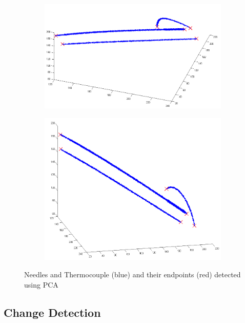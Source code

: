 \documentclass[]{spie}  %
\begin{document}
\begin{figure} 
\centering 
\begin{subfigure}[t]{0.45\textwidth} 
\includegraphics[width=\textwidth]{needleDetection3D_1.png}
\end{subfigure} 
\begin{subfigure}[t]{0.45\textwidth} 
\includegraphics[width=\textwidth]{needleDetection3D_2.png} 
\end{subfigure} 
\caption{Needles and Thermocouple (blue) and their endpoints (red) detected using PCA}
\label{needleDetection} 
\end{figure}

\subsection{Change Detection}
\end{document}
